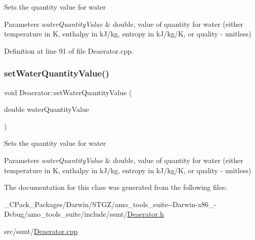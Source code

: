 Sets the quantity value for water 
\begin{DoxyParams}{Parameters}
{\em water\+Quantity\+Value} & double, value of quantity for water (either temperature in K, enthalpy in k\+J/kg, entropy in k\+J/kg/K, or quality -\/ unitless) \\
\hline
\end{DoxyParams}


Definition at line 91 of file Deaerator.\+cpp.

\mbox{\label{class_deaerator_ac31cf2deb8bf30ee6921d1d9f8281eb8}} 
\subsubsection{\texorpdfstring{set\+Water\+Quantity\+Value()}{setWaterQuantityValue()}\hspace{0.1cm}{\footnotesize\ttfamily [3/3]}}
{\footnotesize\ttfamily void Deaerator\+::set\+Water\+Quantity\+Value (\begin{DoxyParamCaption}\item[{double}]{water\+Quantity\+Value }\end{DoxyParamCaption})}

Sets the quantity value for water 
\begin{DoxyParams}{Parameters}
{\em water\+Quantity\+Value} & double, value of quantity for water (either temperature in K, enthalpy in k\+J/kg, entropy in k\+J/kg/K, or quality -\/ unitless) \\
\hline
\end{DoxyParams}


The documentation for this class was generated from the following files\+:\begin{DoxyCompactItemize}
\item 
\+\_\+\+C\+Pack\+\_\+\+Packages/\+Darwin/\+S\+T\+G\+Z/amo\+\_\+tools\+\_\+suite-\/-\/\+Darwin-\/x86\+\_-\/\+Debug/amo\+\_\+tools\+\_\+suite/include/ssmt/\hyperlink{___c_pack___packages_2_darwin_2_s_t_g_z_2amo__tools__suite--_darwin-x86__64-_debug_2amo__tools__6912504c2054fb400df5f751a3431330}{Deaerator.\+h}\item 
src/ssmt/\hyperlink{_deaerator_8cpp}{Deaerator.\+cpp}\end{DoxyCompactItemize}
